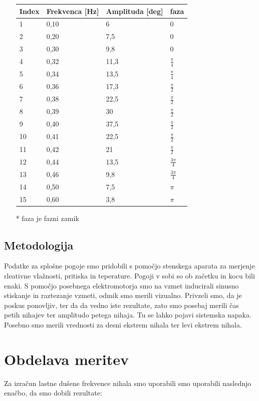 \begin{itemize}
\begin{tabular}{|p{1.5cm}|p{1.5cm}|p{1.5cm}|p{1.5cm}|}
        Index & Frekvenca [Hz] & Amplituda [deg] & faza\\
        \hline
        1 & 0,10 & 6 & 0\\
        2 & 0,20 & 7,5 & 0\\
        3 & 0,30 & 9,8 & 0\\
        4 & 0,32 & 11,3 & $\frac{\pi}{4}$\\
        5 & 0,34 & 13,5 & $\frac{\pi}{4}$\\
        6 & 0,36 & 17,3 & $\frac{\pi}{2}$\\
        7 & 0,38 & 22,5 & $\frac{\pi}{2}$\\
        8 & 0,39 & 30 & $\frac{\pi}{2}$\\
        \hline
        9 & 0,40 & 37,5 & $\frac{\pi}{2}$\\
        \hline
        10 & 0,41 & 22,5 & $\frac{\pi}{2}$\\
        11 & 0,42 & 21 & $\frac{\pi}{2}$\\
        12 & 0,44 & 13,5 & $\frac{3\pi}{4}$\\
        13 & 0,46 & 9,8 & $\frac{3\pi}{4}$\\
        14 & 0,50 & 7,5 & $\pi$\\
        15 & 0,60 & 3,8 & $\pi$\\
        \hline
    \end{tabular}
\item[*]
    faza je fazni zamik
\end{itemize}
\subsection{Metodologija}

Podatke za splošne pogoje smo pridobili s pomočjo stenskega aparata za merjenje rleativne vlažnosti, pritiska in teperature. Pogoji v sobi so ob začetku in kocu bili enaki. S pomočjo posebnega elektromotorja smo na vzmet inducirali sinusno stiskanje in raztezanje vzmeti, odmik smo merili vizualno. Privzeli smo, da je poskus ponovljiv, ter da da vedno iste rezultate, zato smo posebaj merili čas petih nihajev ter amplitudo petega nihaja. Tu se lahko pojavi sistemska napaka. Posebno smo merili vrednosti za desni ekstrem nihala ter levi ekstrem nihala.

\section{Obdelava meritev}
Za izračun lastne dušene frekvence nihala smo uporabili smo uporabili naslednjo enačbo, da smo dobili rezultate:


